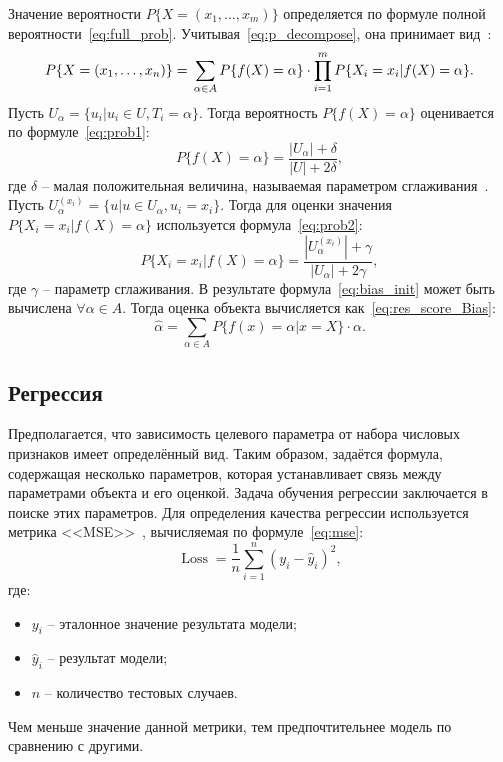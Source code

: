 Значение вероятности $P\{X=(x_1,\dots,x_m)\}$ определяется по формуле полной вероятности~\eqref{eq:full_prob}.
Учитывая~\eqref{eq:p_decompose}, она принимает вид~\cite{aggarwal}:
\begin{equation}
\label{eq:full_prob}
    \small P\{X=(x_1,\dots,x_n)\}=\\
    \sum_{\alpha \in A}{P\{f(X)=\alpha\} \cdot \prod_{i=1}^{m}{P\{X_i=x_i|f(X)=\alpha\}}}.
 \end{equation}
Пусть $U_{\alpha} = \{u_i | u_i \in U, T_i = \alpha\}$.
Тогда вероятность $P\{f(X)=\alpha\}$ оценивается по формуле~\eqref{eq:prob1}:
\begin{equation}
\label{eq:prob1}
    P\{f(X)=\alpha\}=\frac{|U_{\alpha}| + \delta}{|U| + 2\delta},
\end{equation}
где $\delta$ -- малая положительная величина, называемая параметром сглаживания~\cite{aggarwal}.
Пусть $U^{(x_i)}_{\alpha} = \{u | u \in U_{\alpha},u_i=x_i\}$.
Тогда для оценки значения $P\{X_i=x_i|f(X)=\alpha\}$ используется формула~\eqref{eq:prob2}:
\begin{equation}
\label{eq:prob2}
    P\{X_i=x_i|f(X)=\alpha\}=\frac{|U^{(x_i)}_{\alpha}| + \gamma}{|U_{\alpha}| + 2\gamma},
\end{equation}
где $\gamma$ -- параметр сглаживания.
В результате формула~\eqref{eq:bias_init} может быть вычислена $\forall \alpha \in A$.
Тогда оценка объекта вычисляется как~\eqref{eq:res_score_Bias}:
\begin{equation}
\label{eq:res_score_Bias}
    \hat{\alpha} = \sum_{\alpha \in A}{P\{f(x)=\alpha|x=X\}} \cdot \alpha.
\end{equation}

\subsection{Регрессия}
Предполагается, что зависимость целевого параметра от набора числовых признаков имеет определённый вид.
Таким образом, задаётся формула, содержащая несколько параметров, которая устанавливает связь между параметрами объекта и его оценкой.
Задача обучения регрессии заключается в поиске этих параметров.
Для определения качества регрессии используется метрика <<MSE>>~\cite{aggarwal}, вычисляемая по формуле~\eqref{eq:mse}:
\begin{equation}
	\label{eq:mse}
	\operatorname{Loss} = \frac{1}{n}\sum_{i=1}^{n}{(y_i - \hat{y}_i)^2},
\end{equation}
где:
\begin{itemize}
	\item $y_i$ -- эталонное значение результата модели;
	\item $\hat{y}_i$ -- результат модели;
	\item $n$ -- количество тестовых случаев.
\end{itemize}
Чем меньше значение данной метрики, тем предпочтительнее модель по сравнению с другими.


